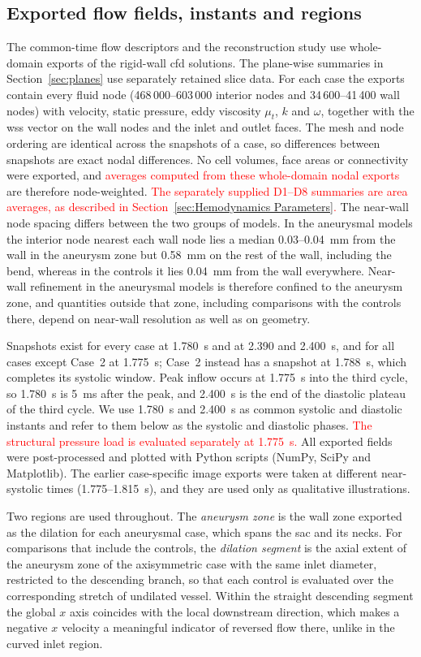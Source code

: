 \documentclass[12pt,a4paper]{article}
\newcommand{\cfdrevision}[1]{\textcolor{red}{#1}}
\newcommand{\CFD}{\ac{cfd}\xspace}
\newcommand{\WSS}{\ac{wss}\xspace}
\theoremstyle{definition}
\numberwithin{equation}{section}
\begin{document}
\subsection{Exported flow fields, instants and regions}
\label{sec:exports}
The common-time flow descriptors and the reconstruction study use whole-domain exports of the rigid-wall \CFD solutions. The plane-wise summaries in Section~\ref{sec:planes} use separately retained slice data. For each case the exports contain every fluid node (468\,000--603\,000 interior nodes and 34\,600--41\,400 wall nodes) with velocity, static pressure, eddy viscosity $\mu_t$, $k$ and $\omega$, together with the \WSS vector on the wall nodes and the inlet and outlet faces. The mesh and node ordering are identical across the snapshots of a case, so differences between snapshots are exact nodal differences. No cell volumes, face areas or connectivity were exported, and \cfdrevision{averages computed from these whole-domain nodal exports} are therefore node-weighted. \cfdrevision{The separately supplied D1--D8 summaries are area averages, as described in Section~\ref{sec:Hemodynamics Parameters}.} The near-wall node spacing differs between the two groups of models. In the aneurysmal models the interior node nearest each wall node lies a median 0.03--0.04~mm from the wall in the aneurysm zone but 0.58~mm on the rest of the wall, including the bend, whereas in the controls it lies 0.04~mm from the wall everywhere. Near-wall refinement in the aneurysmal models is therefore confined to the aneurysm zone, and quantities outside that zone, including comparisons with the controls there, depend on near-wall resolution as well as on geometry.

Snapshots exist for every case at 1.780~s and at 2.390 and 2.400~s, and for all cases except Case~2 at 1.775~s; Case~2 instead has a snapshot at 1.788~s, which completes its systolic window. Peak inflow occurs at 1.775~s into the third cycle, so 1.780~s is 5~ms after the peak, and 2.400~s is the end of the diastolic plateau of the third cycle. We use 1.780~s and 2.400~s as common systolic and diastolic instants and refer to them below as the systolic and diastolic phases. \cfdrevision{The structural pressure load is evaluated separately at 1.775~s.} All exported fields were post-processed and plotted with Python scripts (NumPy, SciPy and Matplotlib). The earlier case-specific image exports were taken at different near-systolic times (1.775--1.815~s), and they are used only as qualitative illustrations.

Two regions are used throughout. The \emph{aneurysm zone} is the wall zone exported as the dilation for each aneurysmal case, which spans the sac and its necks. For comparisons that include the controls, the \emph{dilation segment} is the axial extent of the aneurysm zone of the axisymmetric case with the same inlet diameter, restricted to the descending branch, so that each control is evaluated over the corresponding stretch of undilated vessel. Within the straight descending segment the global $x$ axis coincides with the local downstream direction, which makes a negative $x$ velocity a meaningful indicator of reversed flow there, unlike in the curved inlet region.
\end{document}
